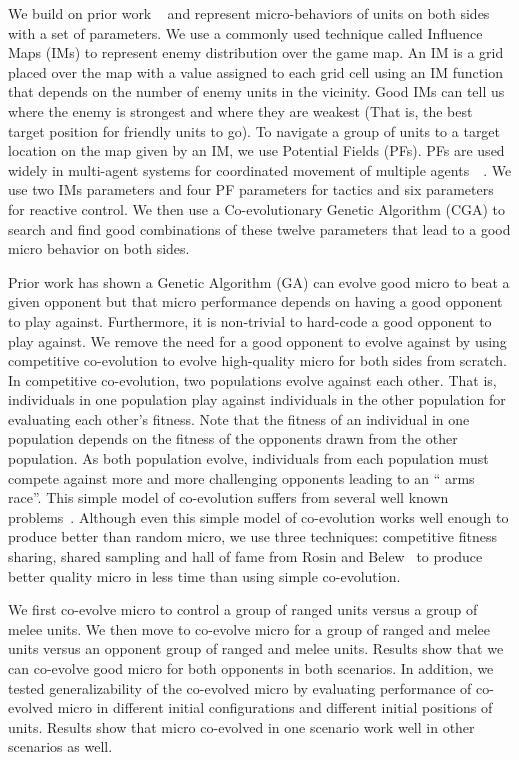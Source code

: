 \documentclass[conference,10pt]{IEEEtran}
\begin{document}
We build on prior work ~\cite{EEMIRSG16} and represent micro-behaviors
of units on both sides with a set of parameters. We use a commonly
used technique called Influence Maps (IMs) to represent enemy
distribution over the game map. An IM is a grid placed over the map
with a value assigned to each grid cell using an IM function that
depends on the number of enemy units in the vicinity. Good IMs can
tell us where the enemy is strongest and where they are weakest (That
is, the best target position for friendly units to go). To navigate a
group of units to a target location on the map given by an IM, we use
Potential Fields (PFs). PFs are used widely in multi-agent systems for
coordinated movement of multiple
agents~\cite{CCNMAS07}~\cite{FCMC01}. We use two IMs parameters and
four PF parameters for tactics and six parameters for reactive
control. We then use a Co-evolutionary Genetic Algorithm (CGA) to
search and find good combinations of these twelve parameters that lead
to a good micro behavior on both sides.

Prior work has shown a Genetic Algorithm (GA) can evolve good micro to
beat a given opponent but that micro performance depends on having a
good opponent to play against. Furthermore, it is non-trivial to
hard-code a good opponent to play against. We remove the need for a
good opponent to evolve against by using competitive co-evolution to
evolve high-quality micro for both sides from scratch. In competitive
co-evolution, two populations evolve against each other. That is,
individuals in one population play against individuals in the other
population for evaluating each other's fitness. Note that the fitness
of an individual in one population depends on the fitness of the
opponents drawn from the other population. As both population evolve,
individuals from each population must compete against more and more
challenging opponents leading to an “ arms race”. This simple model of
co-evolution suffers from several well known
problems~\cite{schonfeld32survery}. Although even this simple model of
co-evolution works well enough to produce better than random micro, we
use three techniques: competitive fitness sharing, shared sampling and
hall of fame from Rosin and Belew~\cite{NMFCC97} to produce better
quality micro in less time than using simple co-evolution.
 
We first co-evolve micro to control a group of ranged units versus a
group of melee units. We then move to co-evolve micro for a group of
ranged and melee units versus an opponent group of ranged and melee
units. Results show that we can co-evolve good micro for both
opponents in both scenarios. In addition, we tested generalizability
of the co-evolved micro by evaluating performance of co-evolved micro
in different initial configurations and different initial positions of
units. Results show that micro co-evolved in one scenario work well in
other scenarios as well.
\end{document}
